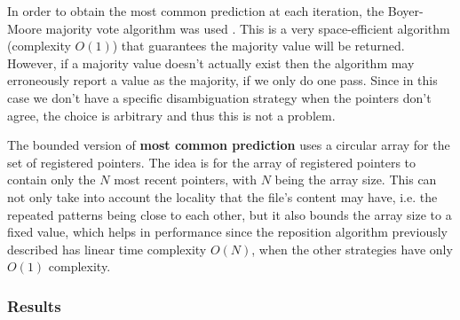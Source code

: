 \documentclass{article}
\begin{document}
In order to obtain the most common prediction at each iteration, the Boyer-Moore majority vote algorithm was used \cite{majority}.
This is a very space-efficient algorithm (complexity $O(1)$) that guarantees the majority value will be returned.
However, if a majority value doesn't actually exist then the algorithm may erroneously report a value as the majority, if we only do one pass.
Since in this case we don't have a specific disambiguation strategy when the pointers don't agree, the choice is arbitrary and thus this is not a problem.

The bounded version of \textbf{most common prediction} uses a circular array for the set of registered pointers.
The idea is for the array of registered pointers to contain only the $N$ most recent pointers, with $N$ being the array size.
This can not only take into account the locality that the file's content may have, i.e. the repeated patterns being close to each other, but it also bounds the array size to a fixed value, which helps in performance since the reposition algorithm previously described has linear time complexity $O(N)$, when the other strategies have only $O(1)$ complexity.

\subsubsection{Results}
\end{document}
